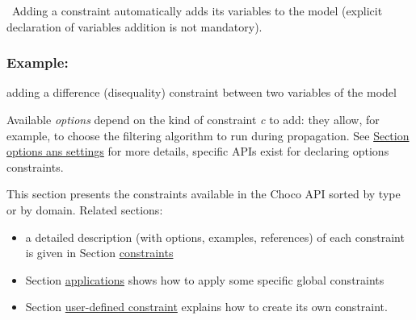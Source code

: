 

\begin{note}\
Adding a constraint automatically adds its variables to the model (explicit declaration of variables addition is not mandatory).
\end{note}


\subsubsection{Example:} adding a difference (disequality) constraint between two variables of the model



Available \emph{options} depend on the kind of constraint \emph{c} to add: they allow, for example, to choose the filtering algorithm to run during propagation. See \hyperlink{optionssettings}{Section options ans settings} for more details, specific APIs exist for declaring options constraints.

This section presents the constraints available in the Choco API sorted by type or by domain. Related sections:
\begin{itemize}
\item a detailed description (with options, examples, references) of each constraint is given in Section \hyperlink{ch:constraints}{constraints}
\item Section \hyperlink{doc:applications}{applications} shows how to apply some specific global constraints
\item Section \hyperlink{advanced:defineyourownconstraint}{user-defined constraint} explains how to create its own constraint.
\end{itemize}


